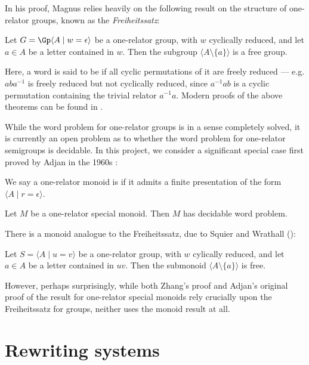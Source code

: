 \documentclass[noindex,noinsetproof,12pt]{lmaths}
\begin{document}
In his proof, Magnus relies heavily on the following result on the structure of one-relator groups, known as the \emph{Freiheitssatz}:

\begin{theorem}[Freiheitssatz] \label{thm:freiheitssatz}
	Let $G = \Gp \langle A \mid w = \epsilon \rangle$ be a one-relator group, with $w$ cyclically reduced, and let $a \in A$ be a letter contained in $w$. Then the subgroup $\langle A \setminus \{a\} \rangle$ is a free group.
\end{theorem}

Here, a word is said to be  if all cyclic permutations of it are freely reduced --- e.g. $aba^{-1}$ is freely reduced but not cyclically reduced, since $a^{-1}ab$ is a cyclic permutation containing the trivial relator $a^{-1}a$. Modern proofs of the above theorems can be found in \cite{Lyndon2001}.

While the word problem for one-relator groups is in a sense completely solved, it is currently an open problem as to whether the word problem for one-relator semigroups is decidable. In this project, we consider a significant special case first proved by Adjan in the 1960s \cite{Adian1966}:

\begin{defn}
We say a one-relator monoid is  if it admits a finite presentation of the form $\langle A \mid r = \epsilon \rangle$.
\end{defn}

\begin{theorem}[Adjan]
	Let $M$ be a one-relator special monoid. Then $M$ has decidable word problem.
\end{theorem}

There is a monoid analogue to the Freiheitssatz, due to Squier and Wrathall (\cite{Squier1983}):
\begin{theorem}
	Let $S = \langle A \mid u = v \rangle$ be a one-relator group, with $w$ cylically reduced, and let $a \in A$ be a letter contained in $uv$. Then the submonoid $\langle A \setminus \{a\} \rangle$ is free.
\end{theorem}
However, perhaps surprisingly, while both Zhang's proof and Adjan's original proof of the result for one-relator special monoids rely crucially upon the Freiheitssatz for groups, neither uses the monoid result at all.


\section{Rewriting systems} \label{sec:rewriting-systems}
\end{document}
